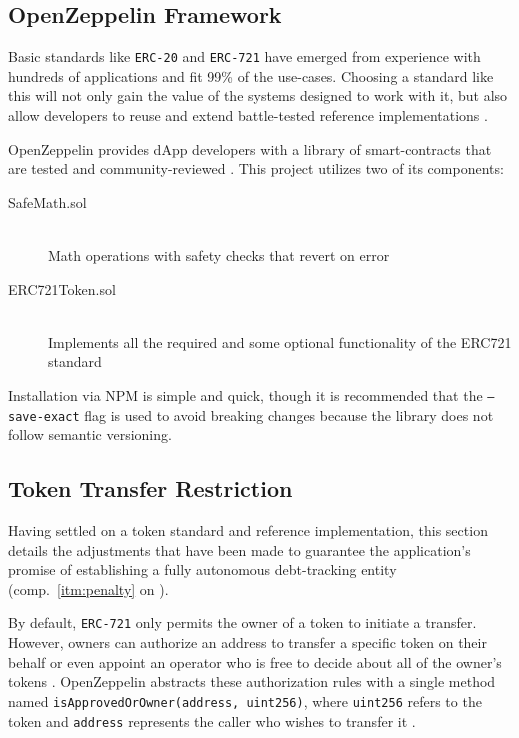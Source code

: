 \subsection{OpenZeppelin Framework}
Basic standards like \texttt{\acs{ERC}-20} and \texttt{\acs{ERC}-721} have emerged from experience with hundreds of applications and fit 99\% of the use-cases. Choosing a standard like this will not only gain the value of the systems designed to work with it, but also allow developers to reuse and extend battle-tested reference implementations \cite[pp.~199--200]{Antonopoulos.2018}. 

OpenZeppelin provides \ac{dApp} developers with a library of smart-contracts that are tested and community-reviewed \cite{openZeppelin}. This project utilizes two of its components:

\begin{description}
  \item[SafeMath.sol]
  \hfill \\
  Math operations with safety checks that revert on error
  \item[ERC721Token.sol]
  \hfill \\Implements all the required and some optional functionality of the ERC721 standard
\end{description}
 
Installation via \acs{NPM} is simple and quick, though it is recommended that the \texttt{--save-exact} flag is used to avoid breaking changes because the library does not follow semantic versioning.
 
\subsection{Token Transfer Restriction}
Having settled on a token standard and reference implementation, this section details the adjustments that have been made to guarantee the application's promise of establishing a fully autonomous debt-tracking entity (comp.~\ref{itm:penalty} on ). 

By default, \texttt{\acs{ERC}-721} only permits the owner of a token to initiate a transfer. However, owners can authorize an address to transfer a specific token on their behalf or even appoint an operator who is free to decide about all of the owner's tokens \cite{erc721}. OpenZeppelin abstracts these authorization rules with a single method named \texttt{isApprovedOrOwner(address, uint256)}, where \texttt{uint256} refers to the token and \texttt{address} represents the caller who wishes to transfer it \cite{openZeppelinGitHub}.

